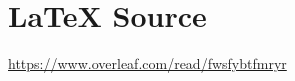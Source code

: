 \documentclass{article}
\theoremstyle{definition}
\begin{document}
\section*{\LaTeX \hspace{0.10 mm} Source}
\url{https://www.overleaf.com/read/fwsfybtfmryr}
%
%
%


%
%
\end{document}
